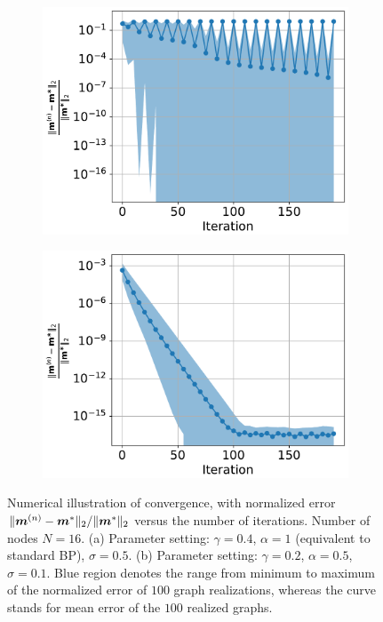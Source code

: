 \begin{figure}[!t]
  \begin{subfigure}{0.5\textwidth}
    \includegraphics[width=1\columnwidth]
    {figures/converge/converge_erp0_4_alpha_1_stn_0_5_vs_filter_false_crop.pdf}
    \caption{}
    \label{fig:log-error-iter-diverse}
  \end{subfigure}
  \begin{subfigure}{0.5\textwidth}
    \includegraphics[width=1\columnwidth]{figures/converge/converge_erp0_2_alpha_0_5_stn_0_1_vs_filter_true-crop.pdf}
    \caption{}
    \label{fig:log-error-iter-converge}
  \end{subfigure}
  \caption{Numerical illustration of convergence, with normalized error ${\| \bm{m}^{(n)}-\bm{m}^{\ast} \|_{2}}/{\| \bm{m}^{\ast} \|_{2}}$ versus the number of iterations. Number of nodes $N=16$. (a) Parameter setting: $\gamma =0.4$, $\alpha = 1$ (equivalent to standard BP), $\sigma = 0.5$. (b) Parameter setting: $\gamma =0.2$, $\alpha = 0.5$, $\sigma = 0.1$.
    Blue region denotes the range from minimum to maximum of the normalized error of $100$ graph realizations, whereas the curve stands for mean error of the $100$ realized graphs. }
  \label{fig:convergence}
\end{figure}



